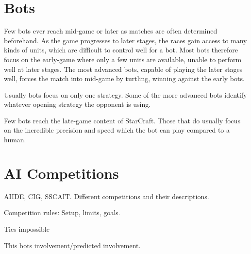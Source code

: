 \section{Bots}
Few bots ever reach mid-game or later as matches are often determined beforehand. As the game progresses to later stages, the races gain access to many kinds of units, which are difficult to control well for a bot. Most bots therefore focus on the early-game where only a few units are available, unable to perform well at later stages. The most advanced bots, capable of playing the later stages well, forces the match into mid-game by turtling, winning against the early bots.

Usually bots focus on only one strategy. Some of the more advanced bots identify whatever opening strategy the opponent is using.

Few bots reach the late-game content of StarCraft. Those that do usually focus on the incredible precision and speed which the bot can play compared to a human.



\section{AI Competitions}
AIIDE, CIG, SSCAIT.
Different competitions and their descriptions.

Competition rules: Setup, limits, goals.

Ties impossible

This bots involvement/predicted involvement.